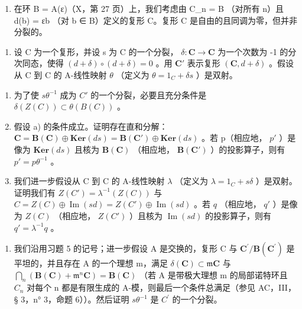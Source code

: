 \begin{enumerate}
\def\labelenumi{\alph{enumi})}
\setcounter{enumi}{1}
\tightlist
\item
  在环 B = A(ε)（X，第 27 页）上，我们考虑由 C\_n = B （对所有 n）且 d(b) = εb （对 b ∈ B）定义的复形 C。复形 C 是自由的且同调为零，但并非分裂的。
\end{enumerate}

\begin{enumerate}
\def\labelenumi{\arabic{enumi})}
\setcounter{enumi}{4}
\tightlist
\item
  设 C 为一个复形，并设 s 为 C 的一个分裂， \(\delta: \mathbf{C} \to \mathbf{C}\) 为一个次数为 -1 的分次同态，使得 \((d + \delta) \circ (d + \delta) = 0\) 。用 \(\mathbf{C}'\) 表示复形 \((\mathbf{C}, d + \delta)\) 。假设从 C 到 C 的 A-线性映射 \(\theta\) （定义为 \(\theta = 1_C + \delta s\) ）是双射。
\end{enumerate}

\begin{enumerate}
\def\labelenumi{\alph{enumi})}
\item
  为了使 \(s\theta^{-1}\) 成为 \(C'\) 的一个分裂，必要且充分条件是 \(\delta(Z(C)) \subset \theta(B(C))\) 。
\item
  假设 a) 的条件成立。证明存在直和分解： \(\mathbf{C} = \mathbf{B}(\mathbf{C}) \oplus \mathbf{Ker}(ds) = \mathbf{B}(\mathbf{C}') \oplus \mathbf{Ker}(ds)\) 。若 p（相应地， \(p'\) ）是像为 \(\mathbf{Ker}(ds)\) 且核为 \(\mathbf{B}(\mathbf{C})\) （相应地， \(\mathbf{B}(\mathbf{C}')\) ）的投影算子，则有 \(p' = p\theta^{-1}\) 。
\item
  我们进一步假设从 C 到 C 的 A-线性映射 \(\lambda\) （定义为 \(\lambda = 1_{C} + s\delta\) ）是双射。证明我们有 \(Z(C') = \lambda^{-1}(Z(C))\) 与 \(C = Z(C) \oplus \operatorname{Im}(sd) = Z(C') \oplus \operatorname{Im}(sd)\) 。若 \(q\) （相应地， \(q'\) ）是像为 \(Z(C)\) （相应地， \(Z(C')\) ）且核为 \(\operatorname{Im}(sd)\) 的投影算子，则有 \(q' = \lambda^{-1} q\) 。
\end{enumerate}

\begin{enumerate}
\def\labelenumi{\arabic{enumi})}
\setcounter{enumi}{5}
\tightlist
\item
  我们沿用习题 5 的记号；进一步假设 A 是交换的，复形 C 与 \(\mathbf{C}^{\prime}/\mathbf{B}(\mathbf{C}^{\prime})\) 是平坦的，并且存在 A 的一个理想 m，满足 \(\delta(\mathbf{C}) \subset \mathfrak{m}\mathbf{C}\) 与 \(\bigcap_{n} (\mathbf{B}(\mathbf{C}) + \mathfrak{m}^{n}\mathbf{C}) = \mathbf{B}(\mathbf{C})\) （若 A 是带极大理想 m 的局部诺特环且 \(C_{n}\) 对每个 n 都是有限生成的 A-模，则最后一个条件总满足（参见 AC，III，§ 3，n° 3，命题 6））。然后证明 \(s\theta^{-1}\) 是 \(C^{\prime}\) 的一个分裂。
\end{enumerate}

